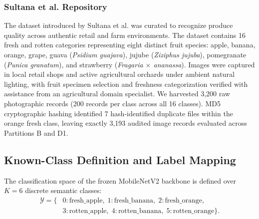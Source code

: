 \subsubsection{Sultana et al. Repository}
The dataset introduced by Sultana et al. \cite{sultana2022extensive} was curated to recognize produce quality across authentic retail and farm environments. The dataset contains 16 fresh and rotten categories representing eight distinct fruit species: apple, banana, orange, grape, guava (\textit{Psidium guajava}), jujube (\textit{Ziziphus jujuba}), pomegranate (\textit{Punica granatum}), and strawberry (\textit{Fragaria $\times$ ananassa}). Images were captured in local retail shops and active agricultural orchards under ambient natural lighting, with fruit specimen selection and freshness categorization verified with assistance from an agricultural domain specialist. We harvested 3,200 raw photographic records (200 records per class across all 16 classes). MD5 cryptographic hashing identified 7 hash-identified duplicate files within the orange fresh class, leaving exactly 3,193 audited image records evaluated across Partitions B and D1.

\subsection{Known-Class Definition and Label Mapping}
\label{sec:known_class_mapping}

The classification space of the frozen MobileNetV2 backbone is defined over $K = 6$ discrete semantic classes:
\begin{equation}
\begin{aligned}
\mathcal{Y} = \{ & 0: \text{fresh\_apple}, \; 1: \text{fresh\_banana}, \; 2: \text{fresh\_orange}, \\
                 & 3: \text{rotten\_apple}, \; 4: \text{rotten\_banana}, \; 5: \text{rotten\_orange} \}.
\end{aligned}
\end{equation}

